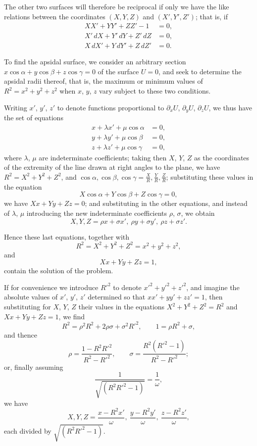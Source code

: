 \documentclass[12pt,a4paper]{article}
\theoremstyle{plain}
\begin{document}
The other two surfaces will therefore be reciprocal if only we have
the like relations between the coordinates $(X,Y,Z)$ and $(X',Y',Z')$;
that is, if
\begin{align*}
XX'+YY'+ZZ'-1 &= 0,\\
X'\,dX+Y'\,dY+Z'\,dZ &= 0,\\
X\,dX'+Y\,dY'+Z\,dZ' &= 0.
\end{align*}

To find the apsidal surface, we consider an arbitrary section
$x\cos\alpha+y\cos\beta+z\cos\gamma=0$ of the surface $U=0$, and seek to
determine the apsidal radii thereof, that is, the maximum or minimum
values of $R^2=x^2+y^2+z^2$ when $x$, $y$, $z$ vary subject to these two
conditions.

Writing $x'$, $y'$, $z'$ to denote functions proportional to
$\partial_xU$, $\partial_yU$, $\partial_zU$, we thus have the set of equations
\begin{align*}
x + \lambda x' + \mu\cos\alpha &= 0,\\
y + \lambda y' + \mu\cos\beta &= 0,\\
z + \lambda z' + \mu\cos\gamma &= 0,
\end{align*}
where $\lambda$, $\mu$ are indeterminate coefficients; taking then $X$, $Y$, $Z$ as
the coordinates of the extremity of the line drawn at right angles to the
plane, we have $R^2=X^2+Y^2+Z^2$, and
$\cos\alpha,\cos\beta,\cos\gamma=\frac{X}{R},\frac{Y}{R},\frac{Z}{R}$; substituting these
values in the equation
\[
X\cos\alpha+Y\cos\beta+Z\cos\gamma=0,
\]
we have $Xx+Yy+Zz=0$; and substituting in the other equations,
and instead of $\lambda$, $\mu$ introducing the new indeterminate coefficients
$\rho$, $\sigma$, we obtain
\[
X,Y,Z = \rho x+\sigma x',\ \rho y+\sigma y',\ \rho z+\sigma z'.
\]

Hence these last equations, together with
\[
R^2 = X^2+Y^2+Z^2 = x^2+y^2+z^2,
\]
and
\[
Xx+Yy+Zz=1,
\]
contain the solution of the problem.

If for convenience we introduce $R'^2$ to denote $x'^2+y'^2+z'^2$, and
imagine the absolute values of $x'$, $y'$, $z'$ determined so that
$xx'+yy'+zz'=1$, then substituting for $X$, $Y$, $Z$ their values in the
equations $X^2+Y^2+Z^2=R^2$ and $Xx+Yy+Zz=1$, we find
\[
R^2 = \rho^2R^2 + 2\rho\sigma + \sigma^2R'^2,\qquad 1 = \rho R^2 + \sigma,
\]
and thence
\[
\rho = \frac{1-R^2R'^2}{R^2-R'^2},\qquad \sigma = \frac{R^2(R'^2-1)}{R^2-R'^2};
\]
or, finally assuming
\[
\frac{1}{\sqrt{(R^2R'^2-1)}} = \frac{1}{\omega},
\]
we have
\[
X,Y,Z = \frac{x-R^2x'}{\omega},\ \frac{y-R^2y'}{\omega},\ \frac{z-R^2z'}{\omega},
\]
each divided by $\sqrt{(R^2R'^2-1)}$.
\end{document}
